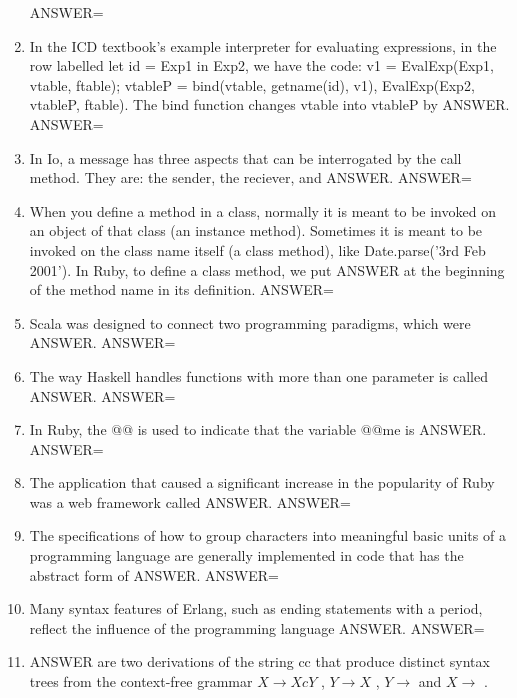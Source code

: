 \documentclass{exam}
\begin{document}
\begin{enumerate}
ANSWER=
\item In the ICD textbook's example interpreter for evaluating expressions, in the row labelled let id = Exp1 in Exp2, we have the code: v1 = EvalExp(Exp1, vtable, ftable); vtableP = bind(vtable, getname(id), v1), EvalExp(Exp2, vtableP, ftable).  The bind function changes vtable into vtableP by ANSWER.\newline
ANSWER=
\item In Io, a message has three aspects that can be interrogated by the call method.  They are: the sender, the reciever, and ANSWER.\newline
ANSWER=
\item When you define a method in a class, normally it is meant to be invoked on an object of that class (an instance method).  Sometimes it is meant to be invoked on the class name itself (a class method), like Date.parse('3rd Feb 2001').  In Ruby, to define a class method, we put ANSWER at the beginning of the method name in its definition.\newline
ANSWER=
\item Scala was designed to connect two programming paradigms, which were ANSWER.\newline
ANSWER=
\item The way Haskell handles functions with more than one parameter is called ANSWER.\newline
ANSWER=
\item In Ruby, the @@ is used to indicate that the variable @@me is ANSWER.\newline
ANSWER=
\item The application that caused a significant increase in the popularity of Ruby was a web framework called ANSWER.\newline
ANSWER=
\item The specifications of how to group characters into meaningful basic units of a programming language are generally implemented in code that has the abstract form of ANSWER.\newline
ANSWER=
\item Many syntax features of Erlang, such as ending statements with a period, reflect the influence of the programming language ANSWER.\newline
ANSWER=
\item ANSWER are two derivations of the string cc that produce distinct syntax trees from the context-free grammar $X \rightarrow X c Y$ , $Y \rightarrow X$ ,  $Y \rightarrow$ and $X \rightarrow$ .\newline

\end{enumerate}
\end{document}
